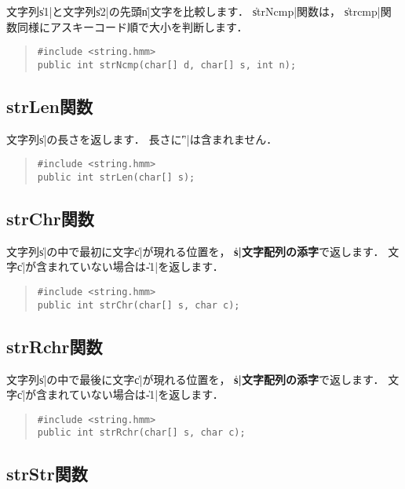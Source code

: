 文字列\|s1|と文字列\|s2|の先頭\|n|文字を比較します．
\|strNcmp|関数は，
\|strcmp|関数同様にアスキーコード順で大小を判断します．

\begin{quote}
\begin{verbatim}
#include <string.hmm>
public int strNcmp(char[] d, char[] s, int n);
\end{verbatim}
\end{quote}

\subsection{strLen関数}

文字列\|s|の長さを返します．
長さに\|'\0'|は含まれません．

\begin{quote}
\begin{verbatim}
#include <string.hmm>
public int strLen(char[] s);
\end{verbatim}
\end{quote}

\subsection{strChr関数}

文字列\|s|の中で最初に文字\|c|が現れる位置を，
{\bf\|s|文字配列の添字}で返します．
文字\|c|が含まれていない場合は\|-1|を返します．

\begin{quote}
\begin{verbatim}
#include <string.hmm>
public int strChr(char[] s, char c);
\end{verbatim}
\end{quote}

\subsection{strRchr関数}

文字列\|s|の中で最後に文字\|c|が現れる位置を，
{\bf\|s|文字配列の添字}で返します．
文字\|c|が含まれていない場合は\|-1|を返します．

\begin{quote}
\begin{verbatim}
#include <string.hmm>
public int strRchr(char[] s, char c);
\end{verbatim}
\end{quote}

\subsection{strStr関数}

